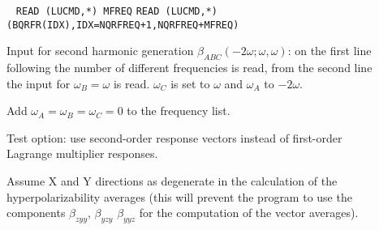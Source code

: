 \begin{description}
\item[]  \verb| |\newline
   \verb|READ (LUCMD,*) MFREQ|\newline
   \verb|READ (LUCMD,*) (BQRFR(IDX),IDX=NQRFREQ+1,NQRFREQ+MFREQ)|

   Input for second harmonic generation
   $\beta_{ABC}(-2\omega;\omega,\omega)$:
   on the first line following  the number of different
   frequencies is read, from the second line the input for 
   $\omega_B = \omega$ is read. $\omega_C$ is set to $\omega$ 
   and $\omega_A$ to $-2\omega$.

\item[] 
   Add $\omega_A = \omega_B = \omega_C = 0$ to the frequency list.

\item[] 
Test option: use second-order response vectors instead of
first-order Lagrange multiplier responses.
 
\item[] 
Assume X and Y directions as degenerate in the calculation
of the hyperpolarizability averages (this will prevent
the program to use the components $\beta_{zyy}$, $\beta_{yzy}$
$\beta_{yyz}$ for the computation of the vector averages).

\end{description}
